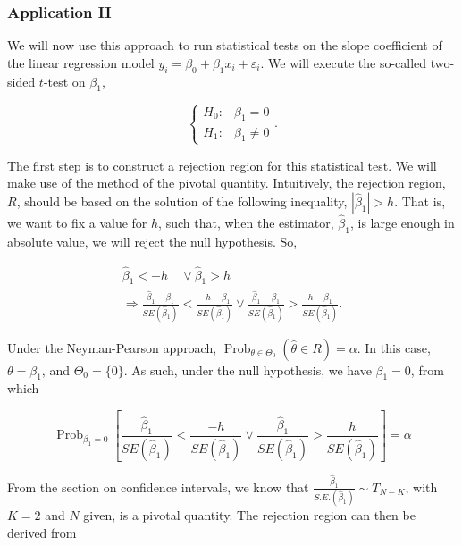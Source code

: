 \subsubsection{Application II}
We will now use this approach to run statistical tests on the slope coefficient of the linear regression model $y_{i}=\beta_{0}+\beta_{1} x_{i}+\varepsilon_{i}$. We will execute the so-called two-sided $t$-test on $\beta_{1}$,

$$
\left\{\begin{array}{ll}
H_{0}: & \beta_{1}=0 \\
H_{1}: & \beta_{1} \neq 0
\end{array} .\right.
$$

The first step is to construct a rejection region for this statistical test. We will make use of the method of the pivotal quantity. Intuitively, the rejection region, $R$, should be based on the solution of the following inequality, $\left|\widehat{\beta}_{1}\right|>h$. That is, we want to fix a value for $h$, such that, when the estimator, $\widehat{\beta}_{1}$, is large enough in absolute value, we will reject the null hypothesis. So,

$$
\begin{gathered}
\widehat{\beta}_{1}<-h \quad \vee \widehat{\beta}_{1}>h \\
\Longrightarrow \frac{\widehat{\beta}_{1}-\beta_{1}}{S E\left(\widehat{\beta}_{1}\right)}<\frac{-h-\beta_{1}}{S E\left(\widehat{\beta}_{1}\right)} \vee \frac{\widehat{\beta}_{1}-\beta_{1}}{S E\left(\widehat{\beta}_{1}\right)}>\frac{h-\beta_{1}}{S E\left(\widehat{\beta}_{1}\right)} .
\end{gathered}
$$

Under the Neyman-Pearson approach, $\operatorname{Prob}_{\theta \in \Theta_{0}}(\widehat{\theta} \in R)=\alpha$. In this case, $\theta=\beta_{1}$, and $\Theta_{0}=\{0\}$. As such, under the null hypothesis, we have $\beta_{1}=0$, from which

$$
\operatorname{Prob}_{\beta_{1}=0}\left[\frac{\widehat{\beta}_{1}}{S E\left(\widehat{\beta}_{1}\right)}<\frac{-h}{S E\left(\widehat{\beta}_{1}\right)} \vee \frac{\widehat{\beta}_{1}}{S E\left(\widehat{\beta}_{1}\right)}>\frac{h}{S E\left(\widehat{\beta}_{1}\right)}\right]=\alpha
$$

From the section on confidence intervals, we know that $\frac{\widehat{\beta}_{1}}{S . E .\left(\widehat{\beta}_{1}\right)} \sim T_{N-K}$, with $K=2$ and $N$ given, is a pivotal quantity. The rejection region can then be derived from

